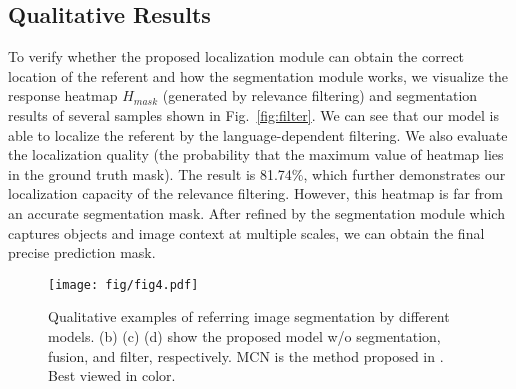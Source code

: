 \subsection{Qualitative Results}

To verify whether the proposed localization module can obtain the correct location of the referent and how the segmentation module works, we visualize the response heatmap $H_{mask}$ (generated by relevance filtering) and segmentation results of several samples shown in Fig.~\ref{fig:filter}. We can see that our model is able to localize the referent by the language-dependent filtering. 
We also evaluate the localization quality (the probability that the maximum value of heatmap lies in the ground truth mask). The result is 81.74\%, which further demonstrates our localization capacity of the relevance filtering. However, this heatmap is far from an accurate segmentation mask. After refined by the segmentation module which captures objects and image context at multiple scales, we can obtain the final precise prediction mask.

\begin{figure*}[t]
\centering
\texttt{[image: fig/fig4.pdf]}
\caption{Qualitative examples of referring image segmentation by different models. (b) (c) (d) show the proposed model w/o segmentation, fusion, and filter, respectively. MCN is the method proposed in \cite{luo2020multi}. Best viewed in color.}
\label{fig:visual}
\end{figure*}


